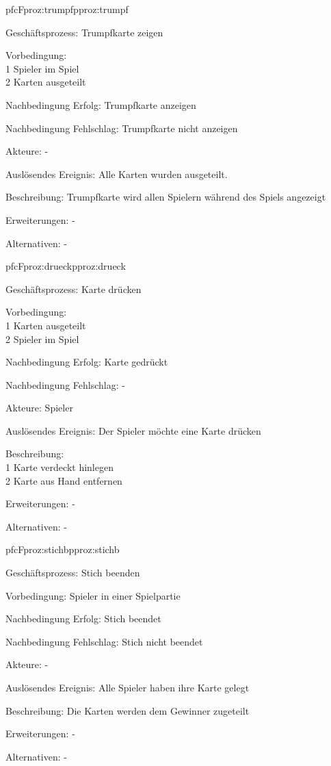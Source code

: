 \begin{description}[leftmargin=3em, style=sameline]
	\begin{php}{pfc}{F}{proz:trumpf}{pproz:trumpf}
		\item [Geschäftsprozess:] Trumpfkarte zeigen
		\item [Vorbedingung:] \hfill\\
		1 Spieler im Spiel \\
		2 Karten ausgeteilt
		\item [Nachbedingung Erfolg:] Trumpfkarte anzeigen
		\item [Nachbedingung Fehlschlag:] Trumpfkarte nicht anzeigen
		\item [Akteure:] -
		\item [Auslösendes Ereignis:] Alle Karten wurden ausgeteilt.
		\item [Beschreibung:] Trumpfkarte wird allen Spielern während des Spiels angezeigt
		\item [Erweiterungen:] -
		\item [Alternativen:] -
	\end{php}	
	
	\begin{php}{pfc}{F}{proz:drueck}{pproz:drueck}
		\item [Geschäftsprozess:] Karte drücken 
		\item [Vorbedingung:]\hfill\\
		1 Karten ausgeteilt\\
		2 Spieler im Spiel
		\item [Nachbedingung Erfolg:] Karte gedrückt
		\item [Nachbedingung Fehlschlag:] -
		\item [Akteure:] Spieler
		\item [Auslösendes Ereignis:] Der Spieler möchte eine Karte drücken
		\item [Beschreibung:]\hfill\\
		1 Karte verdeckt hinlegen \\
		2 Karte aus Hand entfernen
		\item [Erweiterungen:] -
		\item [Alternativen:] -
	\end{php}
	
	
	\begin{php}{pfc}{F}{proz:stichb}{pproz:stichb}
		\item [Geschäftsprozess:] Stich beenden
		\item [Vorbedingung:]
		Spieler in einer Spielpartie
		\item [Nachbedingung Erfolg:] Stich beendet
		\item [Nachbedingung Fehlschlag:] Stich nicht beendet
		\item [Akteure:] -
		\item [Auslösendes Ereignis:] Alle Spieler haben ihre Karte gelegt
		\item [Beschreibung:] Die Karten werden dem Gewinner zugeteilt
		\item [Erweiterungen:] -
		\item [Alternativen:] -
	\end{php}
	

\end{description}
